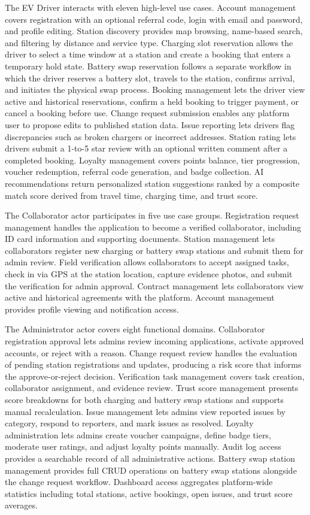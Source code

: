 \documentclass[../Main.tex]{subfiles}
\begin{document}
The EV Driver interacts with eleven high-level use cases. Account management covers registration with an optional referral code, login with email and password, and profile editing. Station discovery provides map browsing, name-based search, and filtering by distance and service type. Charging slot reservation allows the driver to select a time window at a station and create a booking that enters a temporary hold state. Battery swap reservation follows a separate workflow in which the driver reserves a battery slot, travels to the station, confirms arrival, and initiates the physical swap process. Booking management lets the driver view active and historical reservations, confirm a held booking to trigger payment, or cancel a booking before use. Change request submission enables any platform user to propose edits to published station data. Issue reporting lets drivers flag discrepancies such as broken chargers or incorrect addresses. Station rating lets drivers submit a 1-to-5 star review with an optional written comment after a completed booking. Loyalty management covers points balance, tier progression, voucher redemption, referral code generation, and badge collection. AI recommendations return personalized station suggestions ranked by a composite match score derived from travel time, charging time, and trust score.

The Collaborator actor participates in five use case groups. Registration request management handles the application to become a verified collaborator, including ID card information and supporting documents. Station management lets collaborators register new charging or battery swap stations and submit them for admin review. Field verification allows collaborators to accept assigned tasks, check in via GPS at the station location, capture evidence photos, and submit the verification for admin approval. Contract management lets collaborators view active and historical agreements with the platform. Account management provides profile viewing and notification access.

The Administrator actor covers eight functional domains. Collaborator registration approval lets admins review incoming applications, activate approved accounts, or reject with a reason. Change request review handles the evaluation of pending station registrations and updates, producing a risk score that informs the approve-or-reject decision. Verification task management covers task creation, collaborator assignment, and evidence review. Trust score management presents score breakdowns for both charging and battery swap stations and supports manual recalculation. Issue management lets admins view reported issues by category, respond to reporters, and mark issues as resolved. Loyalty administration lets admins create voucher campaigns, define badge tiers, moderate user ratings, and adjust loyalty points manually. Audit log access provides a searchable record of all administrative actions. Battery swap station management provides full CRUD operations on battery swap stations alongside the change request workflow. Dashboard access aggregates platform-wide statistics including total stations, active bookings, open issues, and trust score averages.
\end{document}
